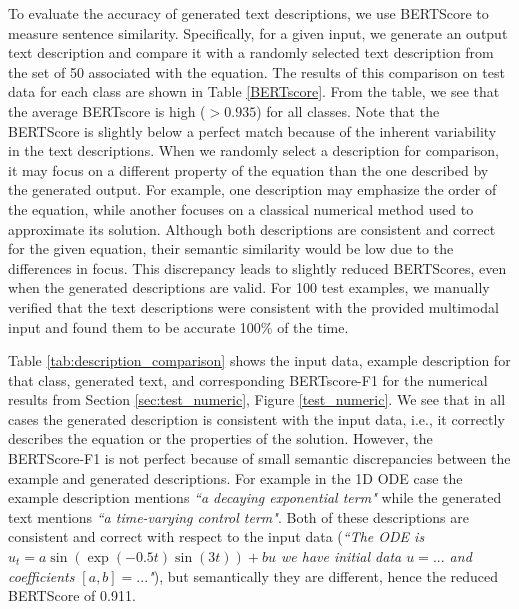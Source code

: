 \documentclass{article}
\begin{document}
To evaluate the accuracy of generated text descriptions, we use BERTScore to measure sentence similarity. Specifically, for a given input, we generate an output text description and compare it with a randomly selected text description from the set of 50 associated with the equation. The results of this comparison on test data for each class are shown in Table \ref{BERTscore}. From the table, we see that the average BERTscore is high ($>0.935$) for all classes. Note that the BERTScore is slightly below a perfect match because of the inherent variability in the text descriptions. When we randomly select a description for comparison, it may focus on a different property of the equation than the one described by the generated output. For example, one description may emphasize the order of the equation, while another focuses on a classical numerical method used to approximate its solution. Although both descriptions are consistent and correct for the given equation, their semantic similarity would be low due to the differences in focus. This discrepancy leads to slightly reduced BERTScores, even when the generated descriptions are valid. For 100 test examples, we manually verified that the text descriptions were consistent with the provided multimodal input and found them to be accurate 100\% of the time.

Table \ref{tab:description_comparison} shows the input data, example description for that class, generated text, and corresponding BERTscore-F1 for the numerical results from Section \ref{sec:test_numeric}, Figure \ref{test_numeric}. We see that in all cases the generated description is consistent with the input data, i.e., it correctly describes the equation or the properties of the solution. However, the BERTScore-F1 is not perfect because of small semantic discrepancies between the example and generated descriptions. For example in the 1D ODE case the example description mentions \textit{``a decaying exponential term"} while the generated text mentions \textit{``a time-varying control term"}. Both of these descriptions are consistent and correct with respect to the input data (\textit{``The ODE is $u_t = a\sin(\exp(-0.5t)\sin(3t)) + bu$ we have initial data $u =...$ and coefficients $[a,b] = ...$"}), but semantically they are different, hence the reduced BERTScore of 0.911. 
\end{document}
